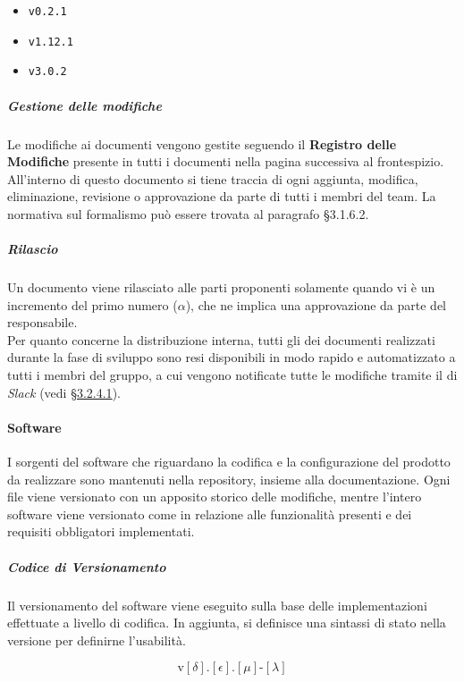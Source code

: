 		\begin{itemize}
			\item \verb!v0.2.1!
			\item \verb!v1.12.1!
			\item \verb!v3.0.2!
		\end{itemize}

		\subparagraph{Gestione delle modifiche}

		Le modifiche ai documenti vengono gestite seguendo il \textbf{Registro delle Modifiche} presente in tutti i documenti nella pagina successiva al frontespizio. All'interno di questo documento si tiene traccia di ogni aggiunta, modifica, eliminazione, revisione o approvazione da parte di tutti i membri del team. La normativa sul formalismo può essere trovata al paragrafo \S 3.1.6.2. %

		\subparagraph{Rilascio}

		Un documento viene rilasciato alle parti proponenti solamente quando vi è un incremento del primo numero (\(\alpha\)), che ne implica una approvazione da parte del responsabile. \\ 
		Per quanto concerne la distribuzione interna, tutti gli  dei documenti realizzati durante la fase di sviluppo sono resi disponibili in modo rapido e automatizzato a tutti i membri del gruppo, a cui vengono notificate tutte le modifiche tramite il  di \textit{Slack} (vedi \hyperref[sec:cd_docs]{\S 3.2.4.1}).

	\paragraph{Software}

	I sorgenti del software che riguardano la codifica e la configurazione del prodotto da realizzare sono mantenuti nella repository, insieme alla documentazione. Ogni file viene versionato con un apposito storico delle modifiche, mentre l'intero software viene versionato come  in relazione alle funzionalità presenti e dei requisiti obbligatori implementati. 


		\subparagraph{Codice di Versionamento}

		Il versionamento del software viene eseguito sulla base delle implementazioni effettuate a livello di codifica. 
		In aggiunta, si definisce una sintassi di stato nella versione per definirne l'usabilità.

		\[%
			\text{v}[\delta].[\epsilon].[\mu]\text{-}[\lambda]
		\]

